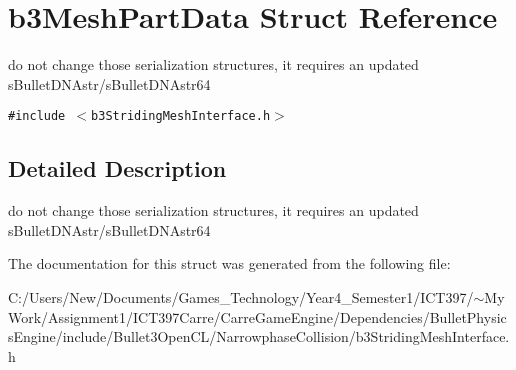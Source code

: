 \hypertarget{structb3_mesh_part_data}{
\section{b3MeshPartData Struct Reference}
\label{structb3_mesh_part_data}
}
do not change those serialization structures, it requires an updated sBulletDNAstr/sBulletDNAstr64  


{\tt \#include $<$b3StridingMeshInterface.h$>$}



\subsection{Detailed Description}
do not change those serialization structures, it requires an updated sBulletDNAstr/sBulletDNAstr64 

The documentation for this struct was generated from the following file:\begin{CompactItemize}
\item 
C:/Users/New/Documents/Games\_\-Technology/Year4\_\-Semester1/ICT397/$\sim$My Work/Assignment1/ICT397Carre/CarreGameEngine/Dependencies/BulletPhysicsEngine/include/Bullet3OpenCL/NarrowphaseCollision/b3StridingMeshInterface.h\end{CompactItemize}
